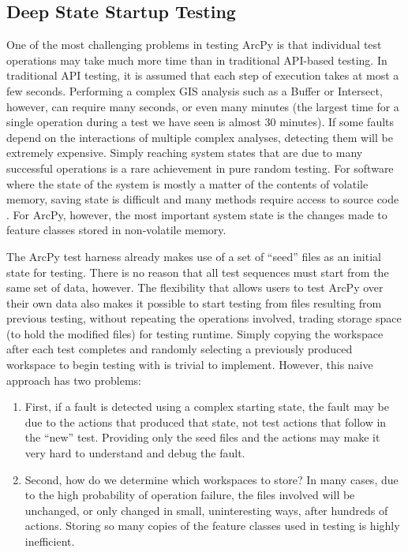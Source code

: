\subsection{Deep State Startup Testing}

One of the most challenging problems in testing ArcPy is that
individual test operations may take much more time than in traditional
API-based testing.  In traditional API testing, it is assumed that
each step of execution takes at most a few seconds.  Performing a
complex GIS analysis such as a Buffer or Intersect, however, can require
many seconds, or even many minutes (the largest time for a single
operation during a test we have seen is almost 30 minutes).  If some faults depend
on the interactions of multiple complex analyses, detecting them will
be extremely expensive.  Simply reaching system states that are due to
many successful operations is a rare achievement in pure random
testing.  For software where the state of the system is mostly a
matter of the contents of volatile memory, saving state is difficult
and many methods require access to source code \cite{ModelDriven}.  For ArcPy,
however, the most important system state is the changes made to
feature classes stored in non-volatile memory.

The ArcPy test harness already makes use of a set of ``seed'' files as
an initial state for testing.  There is no reason that all test
sequences must start from the same set of data, however.  The
flexibility that allows users to test ArcPy over their own data also
makes it possible to start testing from files resulting from previous
testing, without repeating the operations involved, trading storage
space (to hold the modified files) for testing runtime.  Simply
copying the workspace after each test completes and randomly selecting a
previously produced workspace to begin testing with is trivial to
implement.  However, this naive approach has two problems:

\begin{enumerate}
\item First, if a fault is detected using a complex starting state,
  the fault may be due to the actions that produced that state, not
  test actions that follow in the ``new'' test.  Providing only the
  seed files and the actions may make it very hard to understand and
  debug the fault.

\item Second, how do we determine which workspaces to store?  In many
  cases, due to the high probability of operation failure, the files
  involved will be unchanged, or only changed in small, uninteresting
  ways, after hundreds of actions.  Storing so many copies of the
  feature classes used in testing is highly inefficient.
\end{enumerate}

